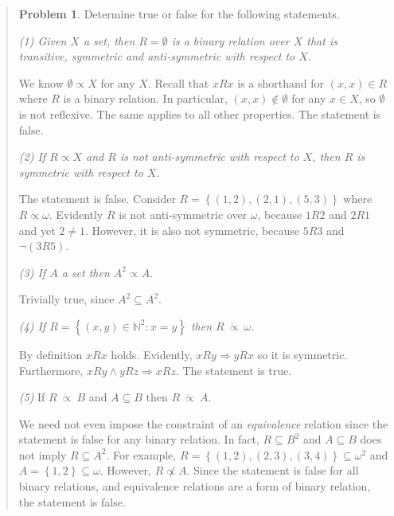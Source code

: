 \documentclass[a4paper, 12pt]{article}
\theoremstyle{definition}
\newtheorem{problem}{Problem}
\theoremstyle{definition}
\theoremstyle{definition}
\begin{document}
\small
\begin{quote}

\begin{problem}
    Determine true or false for the following statements.
\end{problem}

\textit{(1) Given $X$ a set, then $R = \emptyset$ is a binary relation over $X$
that is transitive, symmetric and anti-symmetric with respect to $X$.}

We know $\emptyset \propto X$ for any $X$. Recall that $xRx$ is a shorthand for
$(x, x) \in R$ where $R$ is a binary relation. In particular, $(x, x) \not\in
\emptyset$ for any $x \in X$, so $\emptyset$ is not reflexive. The same applies
to all other properties. The statement is false.

\textit{(2) If $R \propto X$ and $R$ is not anti-symmetric with respect to $X$,
then $R$ is symmetric with respect to $X$}.

The statement is false. Consider $R = \left\{ (1, 2), (2, 1), (5, 3) \right\} $ where $R \propto
\omega$. Evidently $R$ is not anti-symmetric over $\omega$, because $1R2$ and
$2R 1$ and yet $2 \neq 1$. However, it is also not symmetric, because $5R 3$ and
$\neg (3 R 5)$.

\textit{(3) If $A$ a set then $A^2 \propto A$}. 

Trivially true, since $A^2 \subseteq A^2$.

\textit{(4) If $R = \left\{ (x, y) \in \mathbb{N}^2 : x = y \right\} $ then $R
~\ddot{\propto }~ \omega$}.

By definition $xRx$ holds. Evidently, $xRy \Rightarrow yRx$ so it is symmetric.
Furthermore, $xRy \land yRz \Rightarrow xRz$. The statement is true.

\textit{(5)} If $R ~ \ddot{\propto} ~ B$ and $A \subseteq B$ then $R ~
\ddot{\propto} ~A$.

We need not even impose the constraint of an \textit{equivalence} relation since
the statement is false for any binary relation. In fact, $R \subseteq B^2$ and
$A \subseteq B$ does not imply $R \subseteq A^2$. For example, $R = \left\{ (1,
2), (2, 3), (3, 4) \right\} \subseteq \omega^2 $ and $A = \left\{ 1, 2 \right\}
 \subseteq \omega$. However, $R \not\propto A$. Since the statement is false for
 all binary relations, and equivalence relations are a form of binary relation,
 the statement is false.

\end{quote}
\normalsize
\end{document}
